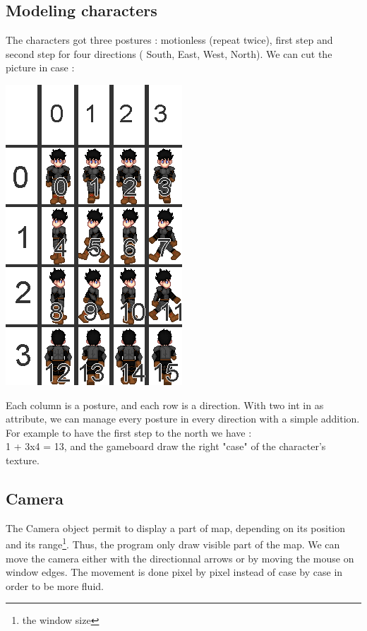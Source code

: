 \documentclass{scrreprt}
\begin{document}
	\subsection{Modeling characters}
	The characters got three postures : motionless (repeat twice), first step and second step for four directions ( South, East, West, North). We can cut the picture in case : 
	\begin{center}
	\includegraphics[scale=0.4]{char.png}
	\end{center}
	Each column is a posture, and each row is a direction. With two int in as attribute, we can manage every posture in every direction with a simple addition. For example to have the first step to the north we have :\\
	1 + 3x4 = 13, and the gameboard draw the right "case" of the character's texture.
	\subsection{Camera}
	The Camera object permit to display a part of map, depending on its position and its range\footnote{the window size}. Thus, the program only draw visible part of the map. We can move the camera either with the directionnal arrows or by moving the mouse on window edges. The movement is done pixel by pixel instead of case by case in order to be more fluid.
\end{document}
